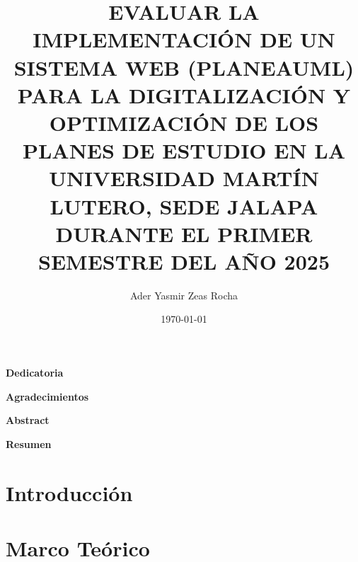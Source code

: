 \documentclass[12pt,letterpaper]{article}
\title{EVALUAR LA IMPLEMENTACIÓN DE UN SISTEMA WEB (PLANEAUML) PARA LA DIGITALIZACIÓN Y OPTIMIZACIÓN DE LOS PLANES DE ESTUDIO EN LA UNIVERSIDAD MARTÍN LUTERO, SEDE JALAPA DURANTE EL PRIMER SEMESTRE DEL AÑO 2025}
\author{Ader Yasmir Zeas Rocha}
\date{\today}
\begin{document}
	
	
	
	
	\clearpage
	\begin{center}\bfseries Dedicatoria \end{center}
	\vspace{1cm} %
	
	\clearpage
	\begin{center}\bfseries Agradecimientos \end{center}
	\vspace{1cm}
	
	\clearpage
	\begin{center}\bfseries Abstract \end{center}
	\vspace{1cm}
	
	\clearpage
	\begin{center}\bfseries Resumen \end{center}
	\vspace{1cm}
	
	\tableofcontents
	
	\setcounter{section}{0} 
	
	
	\section{Introducción}
	
	
	\section{Marco Teórico}
	
	
\end{document}
